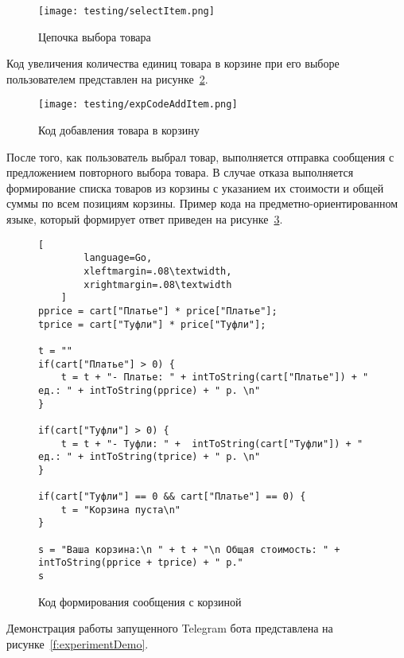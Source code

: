 \begin{figure}[!ht]
	\centering
	\vspace{\toppaddingoffigure}
	\texttt{[image: testing/selectItem.png]}
	\caption{Цепочка выбора товара}
	\label{f:experimentSelectItem}
\end{figure}

Код увеличения количества единиц товара в корзине при его выборе пользователем представлен на рисунке~\ref{f:expCodeAddItem}.

\clearpage

\begin{figure}[!ht]
	\centering
	\texttt{[image: testing/expCodeAddItem.png]}
	\caption{Код добавления товара в корзину}
	\label{f:expCodeAddItem}
\end{figure}

После того, как пользователь выбрал товар, выполняется отправка сообщения с предложением повторного выбора товара.
В случае отказа выполняется формирование списка товаров из корзины с указанием их стоимости и общей суммы по всем позициям корзины.
Пример кода на предметно-ориентированном языке, который формирует ответ приведен на рисунке~\ref{f:endCode}.

\begin{figure}[!ht]
	\centering
	\vspace{\toppaddingoffigure}
	\begin{lstlisting}[
        language=Go,
		xleftmargin=.08\textwidth,
        xrightmargin=.08\textwidth
    ]
pprice = cart["Платье"] * price["Платье"];
tprice = cart["Туфли"] * price["Туфли"];

t = ""
if(cart["Платье"] > 0) {
	t = t + "- Платье: " + intToString(cart["Платье"]) + " ед.: " + intToString(pprice) + " р. \n"
}

if(cart["Туфли"] > 0) { 
	t = t + "- Туфли: " +  intToString(cart["Туфли"]) + " ед.: " + intToString(tprice) + " р. \n"
}

if(cart["Туфли"] == 0 && cart["Платье"] == 0) {
	t = "Корзина пуста\n"
}

s = "Ваша корзина:\n " + t + "\n Общая стоимость: " + intToString(pprice + tprice) + " р."
s
\end{lstlisting}
	\caption{Код формирования сообщения с корзиной}
	\label{f:endCode}
\end{figure}

\clearpage

Демонстрация работы запущенного Telegram бота представлена на рисунке~\ref{f:experimentDemo}.

